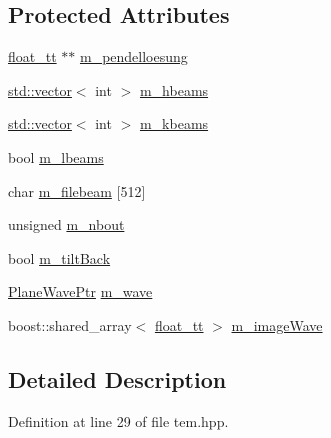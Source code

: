\subsection*{Protected Attributes}
\begin{DoxyCompactItemize}
\item 
\hyperlink{namespace_q_s_t_e_m_a915d7caa497280d9f927c4ce8d330e47}{float\-\_\-tt} $\ast$$\ast$ \hyperlink{class_q_s_t_e_m_1_1_c_experiment_t_e_m_a4a6f12a7b28398c2ab0875f7138bf731}{m\-\_\-pendelloesung}
\item 
\hyperlink{qmb_8m_af54b69a32590de218622e869b06b47b3}{std\-::vector}$<$ int $>$ \hyperlink{class_q_s_t_e_m_1_1_c_experiment_t_e_m_a158be89e938771ae908c44f946f3c208}{m\-\_\-hbeams}
\item 
\hyperlink{qmb_8m_af54b69a32590de218622e869b06b47b3}{std\-::vector}$<$ int $>$ \hyperlink{class_q_s_t_e_m_1_1_c_experiment_t_e_m_a6d5aff0ed8f4f9e0741c3394f9015e3d}{m\-\_\-kbeams}
\item 
bool \hyperlink{class_q_s_t_e_m_1_1_c_experiment_t_e_m_af8861c5a935974357122c8a46a3ff4e8}{m\-\_\-lbeams}
\item 
char \hyperlink{class_q_s_t_e_m_1_1_c_experiment_t_e_m_ad0f92ada3447947c1cfd4675318279ce}{m\-\_\-filebeam} \mbox{[}512\mbox{]}
\item 
unsigned \hyperlink{class_q_s_t_e_m_1_1_c_experiment_t_e_m_a51572d5f8a070f27f638f21cef35d4ba}{m\-\_\-nbout}
\item 
bool \hyperlink{class_q_s_t_e_m_1_1_c_experiment_t_e_m_a5c2f5087986b2b5b43b79b8bd5a2bebe}{m\-\_\-tilt\-Back}
\item 
\hyperlink{namespace_q_s_t_e_m_a1bc6587692685d5942570cc15571fe14}{Plane\-Wave\-Ptr} \hyperlink{class_q_s_t_e_m_1_1_c_experiment_t_e_m_ab0e428cafa2f5585a4e3db77c23310a0}{m\-\_\-wave}
\item 
boost\-::shared\-\_\-array$<$ \hyperlink{namespace_q_s_t_e_m_a915d7caa497280d9f927c4ce8d330e47}{float\-\_\-tt} $>$ \hyperlink{class_q_s_t_e_m_1_1_c_experiment_t_e_m_a83abce7927e8f98feb653c454a0b1209}{m\-\_\-image\-Wave}
\end{DoxyCompactItemize}


\subsection{Detailed Description}


Definition at line 29 of file tem.\-hpp.



